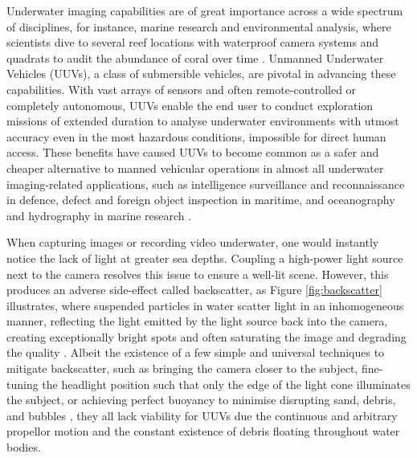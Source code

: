 Underwater imaging capabilities are of great importance across a wide spectrum of disciplines, for instance, marine research and environmental analysis, where scientists dive to several reef locations with waterproof camera systems and quadrats to audit the abundance of coral over time \cite{universityofhawaiiPracticesScienceUnderwater}. Unmanned Underwater Vehicles (UUVs), a class of submersible vehicles, are pivotal in advancing these capabilities. With vast arrays of sensors and often remote-controlled or completely autonomous, UUVs enable the end user to conduct exploration missions of extended duration to analyse underwater environments with utmost accuracy even in the most hazardous conditions, impossible for direct human access. These benefits have caused UUVs to become common as a safer and cheaper alternative to manned vehicular operations in almost all underwater imaging-related applications, such as intelligence surveillance and reconnaissance in defence, defect and foreign object inspection in maritime, and oceanography and hydrography in marine research \cite{yannickallardUnmannedUnderwaterVehicle2014}.

When capturing images or recording video underwater, one would instantly notice the lack of light at greater sea depths. Coupling a high-power light source next to the camera resolves this issue to ensure a well-lit scene. However, this produces an adverse side-effect called backscatter, as Figure \ref{fig:backscatter} illustrates, where suspended particles in water scatter light in an inhomogeneous manner, reflecting the light emitted by the light source back into the camera, creating exceptionally bright spots and often saturating the image and degrading the quality \cite{sidharthshanmugamInitialReportMachine2024}. Albeit the existence of a few simple and universal techniques to mitigate backscatter, such as bringing the camera closer to the subject, fine-tuning the headlight position such that only the edge of the light cone illuminates the subject, or achieving perfect buoyancy to minimise disrupting sand, debris, and bubbles \cite{brentdurandEasyWaysEliminate2013}, they all lack viability for UUVs due the continuous and arbitrary propellor motion and the constant existence of debris floating throughout water bodies.

